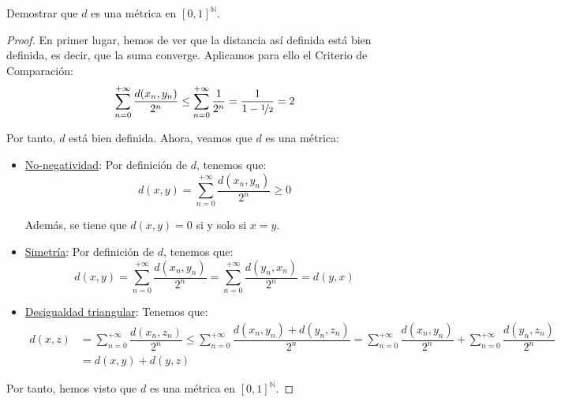 \begin{ejercicio*}
    Demostrar que $d$ es una métrica en ${[0,1]}^{\mathbb{N}}$.
    \begin{proof}
        En primer lugar, hemos de ver que la distancia así definida está bien definida, es decir, que la suma converge. Aplicamos para ello el Criterio de Comparación:
        \begin{equation*}
            \sum_{n=0}^{+\infty} \dfrac{d(x_n,y_n)}{2^n} \leq \sum_{n=0}^{+\infty} \dfrac{1}{2^n} = \dfrac{1}{1-\nicefrac{1}{2}} = 2
        \end{equation*}

        Por tanto, $d$ está bien definida. Ahora, veamos que $d$ es una métrica:
        \begin{itemize}
            \item \underline{No-negatividad}: Por definición de $d$, tenemos que:
                \begin{equation*}
                    d(x,y) = \sum_{n=0}^{+\infty} \dfrac{d(x_n,y_n)}{2^n} \geq 0
                \end{equation*}

                Además, se tiene que $d(x,y) = 0$ si y solo si $x = y$.
            \item \underline{Simetría}: Por definición de $d$, tenemos que:
                \begin{equation*}
                    d(x,y) = \sum_{n=0}^{+\infty} \dfrac{d(x_n,y_n)}{2^n} = \sum_{n=0}^{+\infty} \dfrac{d(y_n,x_n)}{2^n} = d(y,x)
                \end{equation*}
            \item \underline{Desigualdad triangular}: Tenemos que:
                \begin{align*}
                    d(x,z) &= \sum_{n=0}^{+\infty} \dfrac{d(x_n,z_n)}{2^n}
                    \leq \sum_{n=0}^{+\infty} \dfrac{d(x_n,y_n) + d(y_n,z_n)}{2^n}
                    = \sum_{n=0}^{+\infty} \dfrac{d(x_n,y_n)}{2^n} + \sum_{n=0}^{+\infty} \dfrac{d(y_n,z_n)}{2^n} \\
                    &= d(x,y) + d(y,z)
                \end{align*}
            \end{itemize}
        Por tanto, hemos visto que $d$ es una métrica en ${[0,1]}^{\mathbb{N}}$.
    \end{proof}


\end{ejercicio*}
